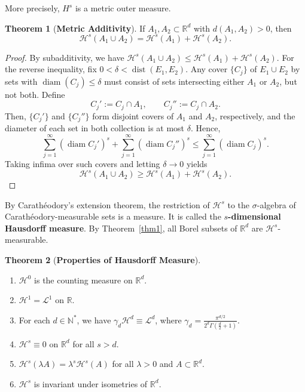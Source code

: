 \documentclass[12pt,a4paper]{report}
\theoremstyle{definition}
\newtheorem{theorem}{Theorem}
\begin{document}
More precisely, $H^s$ is a metric outer measure.
\begin{theorem}[\textbf{Metric Additivity}]
If $A_1, A_2 \subset \mathbb{R}^d$ with \( d(A_1, A_2) > 0 \), then
\[
\mathcal{H}^s(A_1 \cup A_2) = \mathcal{H}^s(A_1) + \mathcal{H}^s(A_2).
\]
\end{theorem}

\begin{proof}
By subadditivity, we have $\mathcal{H}^s(A_1 \cup A_2) \le \mathcal{H}^s(A_1) + \mathcal{H}^s(A_2)$. For the reverse inequality, fix \( 0 < \delta <  \operatorname{dist}(E_1, E_2)  \). Any cover \( \{C_j\} \) of \( E_1 \cup E_2 \) by sets with \( \operatorname{diam}(C_j) \le \delta \) must consist of sets intersecting either \( A_1 \) or \( A_2 \), but not both. Define
\[
C_j' := C_j \cap A_1, \qquad C_j'' := C_j \cap A_2.
\]
Then, \( \{C_j'\} \) and \( \{C_j''\} \) form disjoint covers of \( A_1 \) and \( A_2 \), respectively, and the diameter of each set in both collection is at most $\delta$. Hence,
\[
\sum_{j=1}^\infty (\operatorname{diam} C_j')^s + \sum_{j=1}^\infty (\operatorname{diam} C_j'')^s \le \sum_{j=1}^\infty (\operatorname{diam} C_j)^s.
\]
Taking infima over such covers and letting \( \delta \to 0 \) yields
\[
\mathcal{H}^s(A_1 \cup A_2) \ge \mathcal{H}^s(A_1) + \mathcal{H}^s(A_2).
\]
\end{proof}

By Carathéodory's extension theorem, the restriction of $\mathcal{H}^s$ to the $\sigma$-algebra of Carathéodory-measurable sets is a measure. It is called the \textbf{$s$-dimensional Hausdorff measure}. By Theorem~\ref{thm1}, all Borel subsets of $\mathbb{R}^d$ are
$\mathcal{H}^s$-measurable.

\begin{theorem}[\textbf{Properties of Hausdorff Measure}]
\begin{enumerate}[label=\textnormal{(\alph*)}]
    \item \( \mathcal{H}^0 \) is the counting measure on \( \mathbb{R}^d \).
    \item \( \mathcal{H}^1 = \mathcal{L}^1 \) on \( \mathbb{R} \).
    \item For each \( d \in \mathbb{N}^* \), we have \( \gamma_d \mathcal{H}^d \equiv \mathcal{L}^d \), where \( \gamma_d = \frac{\pi^{d/2}}{2^d \Gamma\left( \frac{d}{2} + 1 \right)} \).
    \item \label{partd} \( \mathcal{H}^s \equiv 0 \) on \( \mathbb{R}^d \) for all \( s > d \).
    \item \( \mathcal{H}^s(\lambda A) = \lambda^s \mathcal{H}^s(A) \) for all \( \lambda > 0 \) and \( A \subset \mathbb{R}^d \).
    \item \( \mathcal{H}^s \) is invariant under isometries of \( \mathbb{R}^d \).
\end{enumerate}
\end{theorem}
\end{document}
